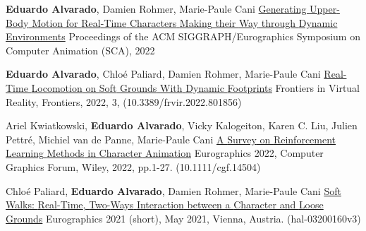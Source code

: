 

\begin{cventries}

\cvpublication
    {\textbf{Eduardo Alvarado}, Damien Rohmer, Marie-Paule Cani} %
    {\href{www.edualvarado.com}{Generating {Upper}-{Body} {Motion} for {Real}-{Time} {Characters} {Making} their {Way} through {Dynamic} {Environments}}} %
    {Proceedings of the ACM SIGGRAPH/Eurographics Symposium on Computer Animation (SCA), 2022} %

\cvpublication
    {\textbf{Eduardo Alvarado}, Chloé Paliard, Damien Rohmer, Marie-Paule Cani} %
    {\href{https://hal.inria.fr/hal-03630136}{Real-{Time} {Locomotion} on {Soft} {Grounds} {With} {Dynamic} {Footprints}}} %
    {Frontiers in Virtual Reality, Frontiers, 2022, 3, (10.3389/frvir.2022.801856)} %

\cvpublication
    {Ariel Kwiatkowski, \textbf{Eduardo Alvarado}, Vicky Kalogeiton, Karen C. Liu, Julien Pettr{\'{e}}, Michiel van de Panne, Marie-Paule Cani} %
    {\href{https://hal.inria.fr/hal-03600947}{A {Survey} on {Reinforcement} {Learning} {Methods} in {Character} {Animation}}} %
    {Eurographics 2022, Computer Graphics Forum, Wiley, 2022, pp.1-27. (10.1111/cgf.14504)} %

\cvpublication
    {Chlo{\'{e}} Paliard, \textbf{Eduardo Alvarado}, Damien Rohmer, Marie-Paule Cani} %
    {\href{https://hal.inria.fr/hal-03200160/}{Soft {Walks}: {Real}-{Time}, {Two}-{Ways} {Interaction} between a {Character} and {Loose} {Grounds}}} %
    {Eurographics 2021 (short), May 2021, Vienna, Austria. (hal-03200160v3)} %
    
\end{cventries}
